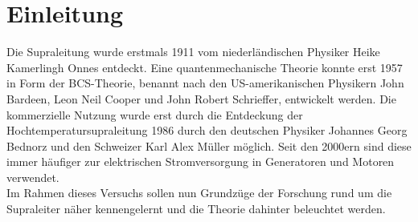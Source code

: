 \chapter{Einleitung}
Die Supraleitung wurde erstmals 1911 vom niederländischen Physiker Heike Kamerlingh
Onnes entdeckt. Eine quantenmechanische Theorie konnte erst 1957 in Form der 
BCS-Theorie, benannt nach den US-amerikanischen Physikern John Bardeen, Leon Neil 
Cooper und John Robert Schrieffer, entwickelt werden.
Die kommerzielle Nutzung wurde erst durch die Entdeckung der 
Hochtemperatursupraleitung 1986 durch den deutschen Physiker Johannes Georg Bednorz
und den Schweizer Karl Alex Müller möglich. Seit den 2000ern sind diese immer 
häufiger zur elektrischen Stromversorgung in Generatoren und Motoren verwendet.\\
Im Rahmen dieses Versuchs sollen nun Grundzüge der Forschung rund um die Supraleiter
näher kennengelernt und die Theorie dahinter beleuchtet werden. \cite{suprawiki}